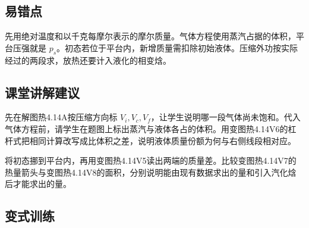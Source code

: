 \documentclass[UTF8,fontset=fandol,a4paper,11pt]{ctexart}
\begin{document}


\subsection*{易错点}

先用绝对温度和以千克每摩尔表示的摩尔质量。气体方程使用蒸汽占据的体积，平台压强就是 $p_s$。初态若位于平台内，新增质量需扣除初始液体。压缩外功按实际经过的两段求，放热还要计入液化的相变焓。



\subsection*{课堂讲解建议}

先在解图热4.14A按压缩方向标 $V_i,V_c,V_f$，让学生说明哪一段气体尚未饱和。代入气体方程前，请学生在题图上标出蒸汽与液体各占的体积。用变图热4.14V6的杠杆式把相同计算改写成比体积之差，说明液体质量份额为何与右侧线段相对应。

将初态挪到平台内，再用变图热4.14V5读出两端的质量差。比较变图热4.14V7的热量箭头与变图热4.14V8的面积，分别说明能由现有数据求出的量和引入汽化焓后才能求出的量。



\subsection*{变式训练}
\end{document}
